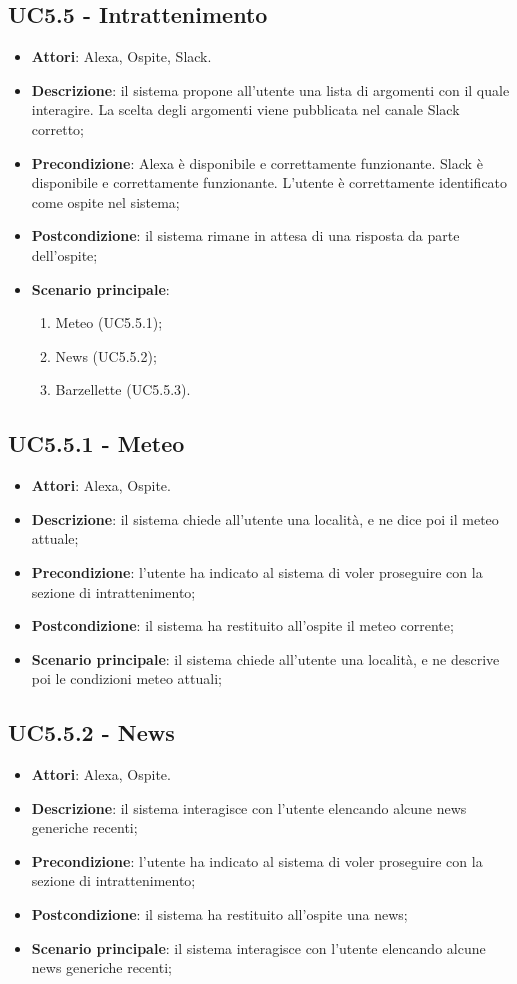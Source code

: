 \documentclass[../AnalisiDeiRequisiti_v4.0.0.tex]{subfiles}
\begin{document}
\subsection{UC5.5 - Intrattenimento} 
\label{sssec:UC5.5} 
\begin{itemize} 
\item \textbf{Attori}: Alexa, Ospite, Slack.
\item \textbf{Descrizione}: il sistema propone all'utente una lista di argomenti con il quale interagire. La scelta degli argomenti viene pubblicata nel canale Slack corretto;
\item \textbf{Precondizione}: Alexa è disponibile e correttamente funzionante. Slack è disponibile e correttamente funzionante. L'utente è correttamente identificato come ospite nel sistema;
\item \textbf{Postcondizione}: il sistema rimane in attesa di una risposta da parte dell'ospite;
\item \textbf{Scenario principale}: \begin{enumerate}\item Meteo (UC5.5.1);\item News (UC5.5.2);\item Barzellette (UC5.5.3). 
 \end{enumerate}
\end{itemize} 
\subsection{UC5.5.1 - Meteo} 
\label{sssec:UC5.5.1} 
\begin{itemize} 
\item \textbf{Attori}: Alexa, Ospite.
\item \textbf{Descrizione}: il sistema chiede all'utente una località, e ne dice poi il meteo attuale;
\item \textbf{Precondizione}: l'utente ha indicato al sistema di voler proseguire con la sezione di intrattenimento;
\item \textbf{Postcondizione}: il sistema ha restituito all'ospite il meteo corrente;
\item \textbf{Scenario principale}: il sistema chiede all'utente una località, e ne descrive poi le condizioni meteo attuali;
\end{itemize} 
\subsection{UC5.5.2 - News} 
\label{sssec:UC5.5.2} 
\begin{itemize} 
\item \textbf{Attori}: Alexa, Ospite.
\item \textbf{Descrizione}: il sistema interagisce con l'utente elencando alcune news generiche recenti;
\item \textbf{Precondizione}: l'utente ha indicato al sistema di voler proseguire con la sezione di intrattenimento;
\item \textbf{Postcondizione}: il sistema ha restituito all'ospite una news;
\item \textbf{Scenario principale}: il sistema interagisce con l'utente elencando alcune news generiche recenti;
\end{itemize} 
\end{document}
